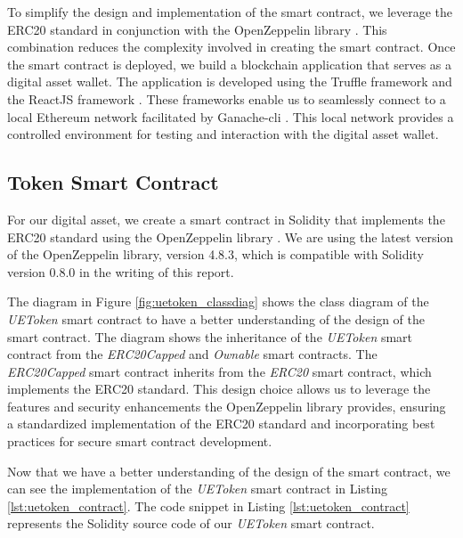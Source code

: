 To simplify the design and implementation of the smart contract, we leverage the ERC20 standard \cite{eth_erc20} in conjunction with 
the OpenZeppelin library \cite{openzeppelin_erc20}. This combination reduces the complexity involved in creating the smart contract. Once the smart contract is deployed, we build a blockchain application that serves as a digital asset wallet.
The application is developed using the Truffle framework \cite{truffle} and the ReactJS framework \cite{react}. These frameworks enable
 us to seamlessly connect to a local Ethereum network facilitated by Ganache-cli \cite{trufflesuite_ganachecli}. This local network 
 provides a controlled environment for testing and interaction with the digital asset wallet.




\subsection{Token Smart Contract}

For our digital asset, we create a smart contract in Solidity \cite{ethereum_solidity_doc} that implements
the ERC20 standard \cite{eth_erc20} using the OpenZeppelin library \cite{openzeppelin_erc20}. We are using the
latest version of the OpenZeppelin library, version 4.8.3, which is compatible with Solidity version 0.8.0
in the writing of this report.




The diagram in Figure \ref{fig:uetoken_classdiag} shows the class diagram of the \textit{UEToken} smart contract to have a better understanding of the design
of the smart contract. The diagram shows the inheritance of the \textit{UEToken} smart contract from the \textit{ERC20Capped} and \textit{Ownable}
smart contracts. The \textit{ERC20Capped} smart contract inherits from the \textit{ERC20} smart contract, which implements the ERC20 standard. This design choice allows us to leverage the features and security enhancements the OpenZeppelin library provides, ensuring a standardized implementation of the ERC20 standard and incorporating best practices for
secure smart contract development.





Now that we have a better understanding of the design of the smart contract, we can see the implementation of the \textit{UEToken} smart contract in Listing \ref{lst:uetoken_contract}.
The code snippet in Listing \ref{lst:uetoken_contract} represents the Solidity source code of our \textit{UEToken} smart contract.


